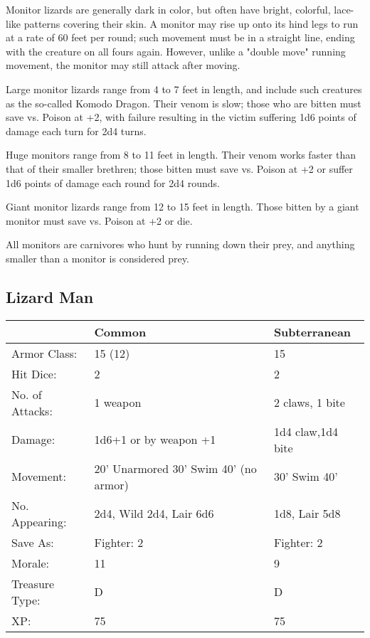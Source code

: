 \documentclass[a4paper,twoside,openany,10pt]{book}
\begin{document}
\begin{multicols}{2}
Monitor lizards are generally dark in color, but often have bright, colorful, lace-like patterns covering their skin. A monitor may rise up onto its hind legs to run at a rate of 60 feet per round; such movement must be in a straight line, ending with the creature on all fours again. However, unlike a "double move" running movement, the monitor may still attack after moving.

Large monitor lizards range from 4 to 7 feet in length, and include such creatures as the so-called Komodo Dragon. Their venom is slow; those who are bitten must save vs. Poison at +2, with failure resulting in the victim suffering 1d6 points of damage each turn for 2d4 turns. 

Huge monitors range from 8 to 11 feet in length. Their venom works faster than that of their smaller brethren; those bitten must save vs. Poison at +2 or suffer 1d6 points of damage each round for 2d4 rounds. 

Giant monitor lizards range from 12 to 15 feet in length. Those bitten by a giant monitor must save vs. Poison at +2 or die. 

All monitors are carnivores who hunt by running down their prey, and anything smaller than a monitor is considered prey.

\subsection*{Lizard Man}\label{lizard-man}

\begin{tabularx}{0.50\textwidth}{@{}lXX@{}}
& Common & Subterranean \\\hline
Armor Class: & 15 (12) & 15 \\\hline
Hit Dice: & 2 & 2 \\\hline
No. of Attacks: & 1 weapon & 2 claws, 1 bite \\\hline
Damage: & 1d6+1 or by weapon +1 & 1d4 claw,1d4 bite \\\hline
Movement: & 20' Unarmored 30' Swim 40' (no armor) & 30' Swim 40' \\\hline
No. Appearing: & 2d4, Wild 2d4, Lair 6d6 & 1d8, Lair 5d8 \\\hline
Save As: & Fighter: 2 & Fighter: 2 \\\hline
Morale: & 11 & 9 \\\hline
Treasure Type: & D & D \\\hline
XP: & 75 & 75 \\\hline
\end{tabularx}\medskip


\end{multicols}
\end{document}
